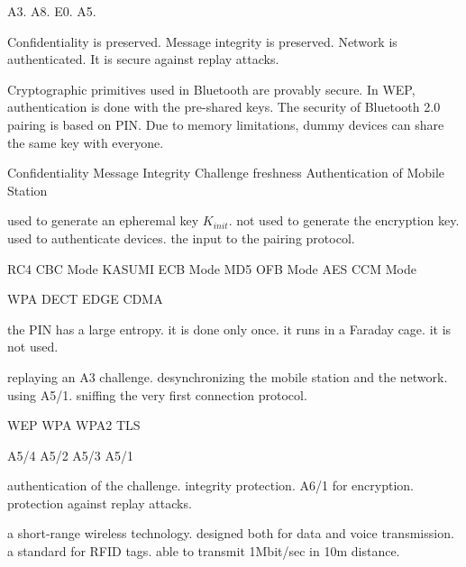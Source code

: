  {A3.}
 {A8.}
 {E0.}
 {A5.}

 {Confidentiality is preserved. }
 {Message integrity is preserved.}
 {Network is authenticated.}
 {It is secure against replay attacks.}
 
{Cryptographic primitives used in Bluetooth are provably secure.}
{In WEP, authentication is done with the pre-shared keys.}
{The security of Bluetooth 2.0 pairing is  based on PIN.}
{Due to memory limitations, dummy devices can share the same key with everyone.}


 {Confidentiality}
{Message Integrity}
{Challenge freshness}
{Authentication of Mobile Station}

{used to generate an epheremal key $K_{init}$.}
{not used to generate the encryption key.}
{used to authenticate devices.}
{the input to the pairing protocol.}



{RC4 CBC Mode}
{KASUMI ECB Mode}
{MD5 OFB Mode}
{AES CCM Mode}


{WPA}
{DECT}
{EDGE}
{CDMA}

{the PIN has a large entropy.}
{it is done only once.}
{it runs in a Faraday cage.}
{it is not used.}

{replaying an A3 challenge.}
{desynchronizing the mobile station and the network.}
{using A5/1.}
{sniffing the very first connection protocol.}

{WEP}
{WPA}
{WPA2}
{TLS}


{A5/4}
{A5/2}
{A5/3}
{A5/1}

{authentication of the challenge.}
{integrity protection.}
{A6/1 for encryption.}
{protection against replay attacks.}


{a short-range wireless technology.}
{designed both for data and voice transmission.}
{a standard for RFID tags.}
{able to transmit 1Mbit/sec in 10m distance.}

